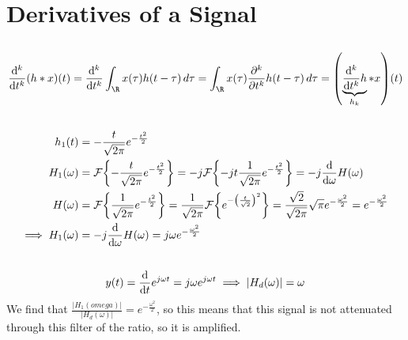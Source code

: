\documentclass{article}
\newcommand{\F}{\mathcal{F}}
\begin{document}
\section{Derivatives of a Signal}

\subsection{}

\begin{equation}
    \dv[k]{t} (h \ast x)(t) = \dv[k]{t} \int_{\R} x(\tau) h(t - \tau) \, d\tau = \int_{\R} x(\tau) \pdv[k]{t} h(t - \tau) \, d\tau = \qty(\underbrace{\dv[k]{t} h}_{h_k} \ast x)(t)
\end{equation}

\subsection{}

\begin{align}
    h_1(t) &= -\frac{t}{\sqrt{2\pi}} e^{-\frac{t^2}{2}} \\
    H_1(\omega) &= \F\qty{-\frac{t}{\sqrt{2\pi}} e^{-\frac{t^2}{2}}} = -j \F\qty{-jt \frac{1}{\sqrt{2\pi}} e^{-\frac{t^2}{2}}} = -j \dv{\omega} H(\omega) \\
    H(\omega) &= \F\qty{\frac{1}{\sqrt{2\pi}} e^{-\frac{t^2}{2}}} = \frac{1}{\sqrt{2\pi}} \F\qty{e^{-\qty(\frac{t}{\sqrt{2}})^2}} = \frac{\sqrt{2}}{\sqrt{2\pi}} \sqrt{\pi} e^{-\frac{\omega^2}{2}} = e^{-\frac{\omega^2}{2}} \\
    \implies H_1(\omega) &= -j \dv{\omega} H(\omega) = j\omega e^{-\frac{\omega^2}{2}}
\end{align}
\begin{center}
\end{center}

\subsection{}

\begin{equation}
    y(t) = \dv{t} e^{j \omega t} = j\omega e^{j \omega t} \implies |H_d(\omega)| = \omega
\end{equation}
We find that \(\frac{|H_1(omega)|}{|H_d(\omega)|} = e^{-\frac{\omega^2}{2}}\), so this means that this signal is not attenuated through this filter of the ratio, so it is amplified.
\end{document}
